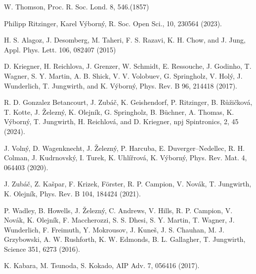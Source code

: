 \documentclass[prb,showpacs,amsmath,amssymb,superscriptaddress,twocolumn,floatfix]{revtex4-1}
\begin{document}
\begin{thebibliography}{99}



 W. Thomson, Proc. R. Soc. Lond. 8, 546.(1857) %

 Philipp Ritzinger, Karel V\'yborn\'y, R. Soc. Open Sci., 10, 230564 (2023). %

 H. S. Alagoz, J. Desomberg, M. Taheri, F. S. Razavi, K. H. Chow, and J. Jung, Appl. Phys. Lett. 106, 082407 (2015)


 D. Kriegner, H. Reichlova, J. Grenzer, W. Schmidt, E. Ressouche, J. Godinho, T. Wagner, S. Y. Martin, A. B. Shick, V. V. Volobuev, G. Springholz, V. Hol\'{y}, J. Wunderlich, T. Jungwirth, and K. V\'{y}born\'{y}, Phys. Rev. B 96, 214418 (2017). %

 R. D. Gonzalez Betancourt, J. Zub\'a\v{c}, K. Geishendorf, P. Ritzinger, B. R\r{u}\v{z}i\v{c}kov\'a, T. Kotte, J. \v{Z}elezn\'y, K. Olejn\'ik, G. Springholz, B. B\"uchner, A. Thomas, K. V\'yborn\'y, T. Jungwirth, H. Reichlov\'a, and D. Kriegner, npj Spintronics, 2, 45 (2024). %


 J. Voln\'y, D. Wagenknecht, J. \v{Z}elezn\'y, P. Harcuba, E. Duverger–Nedellec, R. H. Colman, J. Kudrnovsk\'y, I. Turek, K. Uhl\'i\v{r}rov\'a, K. V\'yborn\'y, Phys. Rev. Mat. 4, 064403 (2020).%

 J. Zub\'a\v{c}, Z. Ka\v{s}par, F. Krizek, F\"orster, R. P. Campion, V. Nov\'ak, T. Jungwirth, K. Olejn\'ik, Phys. Rev. B 104, 184424 (2021). %

 P. Wadley, B. Howells, J. \v{Z}elezn\'y, C. Andrews, V. Hills, R. P. Campion, V. Nov\'ak, K. Olejn\'ik, F. Maccherozzi, S. S. Dhesi, S. Y. Martin, T. Wagner, J. Wunderlich, F. Freimuth, Y. Mokrousov, J. Kune\v{s}, J. S. Chauhan, M. J. Grzybowski, A. W. Rushforth, K. W. Edmonds, B. L. Gallagher, T. Jungwirth, Science 351, 6273 (2016). %

 K. Kabara, M. Tsunoda, S. Kokado, AIP Adv. 7, 056416 (2017). %


\end{thebibliography}
\end{document}
